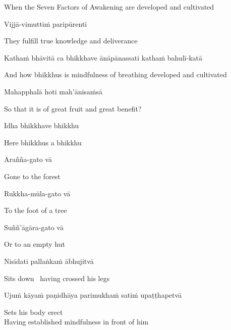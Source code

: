 \begin{english}
  When the Seven Factors of Awakening are developed and cultivated
\end{english}

Vijjā-vimuttiṁ paripūrenti

\begin{english}
  They fulfill true knowledge and deliverance
\end{english}

Kathaṁ bhāvitā ca bhikkhave ānāpānassati kathaṁ bahulī-katā

\begin{english-hang}
  And how bhikkhus is mindfulness of breathing developed and cultivated
\end{english-hang}

Mahapphalā hoti mah'ānisaṁsā

\begin{english}
  So that it is of great fruit and great benefit?
\end{english}

Idha bhikkhave bhikkhu

\begin{english}
  Here bhikkhus a bhikkhu
\end{english}

Arañña-gato vā

\begin{english}
  Gone to the forest
\end{english}

Rukkha-mūla-gato vā

\begin{english}
  To the foot of a tree
\end{english}

Suññ'āgāra-gato vā

\begin{english}
  Or to an empty hut
\end{english}

Nisīdati pallaṅkaṁ ābhujitvā

\begin{english}
  Sits down \breathmark\ having crossed his legs
\end{english}

Ujuṁ kāyaṁ paṇidhāya parimukhaṁ satiṁ upaṭṭhapetvā

\begin{english}
  Sets his body erect\\
  Having established mindfulness in front of him
\end{english}


